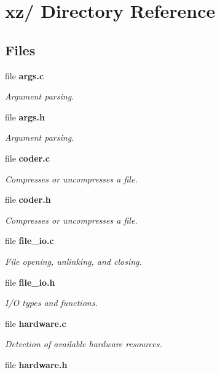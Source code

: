 \section{xz/ Directory Reference}
\label{dir_53e01eec41348db90f08d9ee7e6793af}
\subsection*{Files}
\begin{DoxyCompactItemize}
\item 
file {\bf args.\-c}
\begin{DoxyCompactList}\small\item\em Argument parsing. \end{DoxyCompactList}\item 
file {\bf args.\-h}
\begin{DoxyCompactList}\small\item\em Argument parsing. \end{DoxyCompactList}\item 
file {\bf coder.\-c}
\begin{DoxyCompactList}\small\item\em Compresses or uncompresses a file. \end{DoxyCompactList}\item 
file {\bf coder.\-h}
\begin{DoxyCompactList}\small\item\em Compresses or uncompresses a file. \end{DoxyCompactList}\item 
file {\bf file\-\_\-io.\-c}
\begin{DoxyCompactList}\small\item\em File opening, unlinking, and closing. \end{DoxyCompactList}\item 
file {\bf file\-\_\-io.\-h}
\begin{DoxyCompactList}\small\item\em I/\-O types and functions. \end{DoxyCompactList}\item 
file {\bf hardware.\-c}
\begin{DoxyCompactList}\small\item\em Detection of available hardware resources. \end{DoxyCompactList}\item 
file {\bfseries hardware.\-h}
\item 

\end{DoxyCompactItemize}
